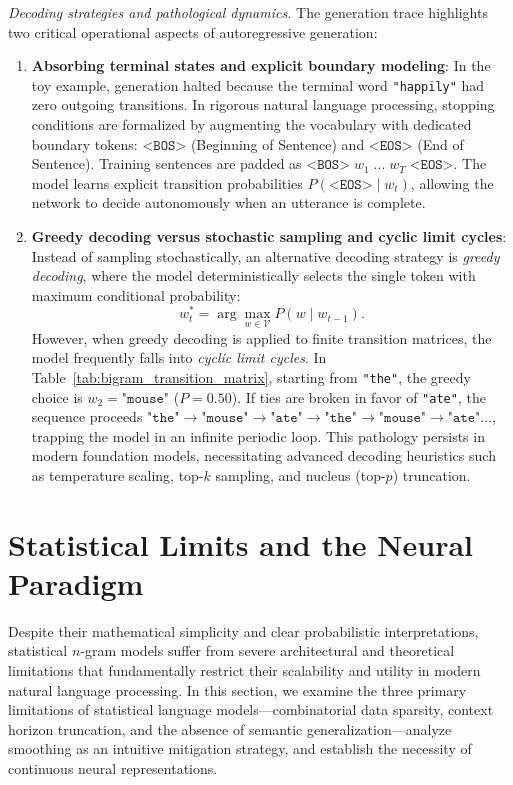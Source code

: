 \documentclass[../../main.tex]{subfiles}
\begin{document}
\textit{Decoding strategies and pathological dynamics.} The generation trace highlights two critical operational aspects of autoregressive generation:
\begin{enumerate}
    \item \textbf{Absorbing terminal states and explicit boundary modeling}: In the toy example, generation halted because the terminal word \texttt{"happily"} had zero outgoing transitions. In rigorous natural language processing, stopping conditions are formalized by augmenting the vocabulary with dedicated boundary tokens: $\texttt{<BOS>}$ (Beginning of Sentence) and $\texttt{<EOS>}$ (End of Sentence). Training sentences are padded as $\texttt{<BOS>} \; w_1 \; \dots \; w_T \; \texttt{<EOS>}$. The model learns explicit transition probabilities $P(\texttt{<EOS>} \mid w_t)$, allowing the network to decide autonomously when an utterance is complete.
    \item \textbf{Greedy decoding versus stochastic sampling and cyclic limit cycles}: Instead of sampling stochastically, an alternative decoding strategy is \textit{greedy decoding}, where the model deterministically selects the single token with maximum conditional probability:
    \begin{equation}
    w_t^* = \arg\max_{w \in \mathcal{V}} P\left(w \mid w_{t-1}\right).
    \label{eq:greedy_decoding}
    \end{equation}
    However, when greedy decoding is applied to finite transition matrices, the model frequently falls into \textit{cyclic limit cycles}. In Table~\ref{tab:bigram_transition_matrix}, starting from \texttt{"the"}, the greedy choice is $w_2 = \texttt{"mouse"}$ ($P = 0.50$). If ties are broken in favor of \texttt{"ate"}, the sequence proceeds $\texttt{"the"} \to \texttt{"mouse"} \to \texttt{"ate"} \to \texttt{"the"} \to \texttt{"mouse"} \to \texttt{"ate"} \dots$, trapping the model in an infinite periodic loop. This pathology persists in modern foundation models, necessitating advanced decoding heuristics such as temperature scaling, top-$k$ sampling, and nucleus (top-$p$) truncation.
\end{enumerate}

\clearpage
\section{Statistical Limits and the Neural Paradigm}
\label{sec:statistical_lm_limitations}

Despite their mathematical simplicity and clear probabilistic interpretations, statistical $n$-gram models suffer from severe architectural and theoretical limitations that fundamentally restrict their scalability and utility in modern natural language processing. In this section, we examine the three primary limitations of statistical language models---combinatorial data sparsity, context horizon truncation, and the absence of semantic generalization---analyze smoothing as an intuitive mitigation strategy, and establish the necessity of continuous neural representations.
\end{document}
